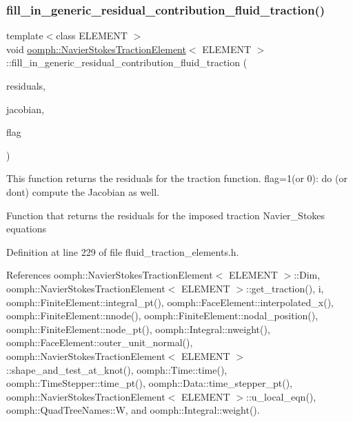 \subsubsection{\texorpdfstring{fill\+\_\+in\+\_\+generic\+\_\+residual\+\_\+contribution\+\_\+fluid\+\_\+traction()}{fill\_in\_generic\_residual\_contribution\_fluid\_traction()}}
{\footnotesize\ttfamily template$<$class E\+L\+E\+M\+E\+NT $>$ \\
void \hyperlink{classoomph_1_1NavierStokesTractionElement}{oomph\+::\+Navier\+Stokes\+Traction\+Element}$<$ E\+L\+E\+M\+E\+NT $>$\+::fill\+\_\+in\+\_\+generic\+\_\+residual\+\_\+contribution\+\_\+fluid\+\_\+traction (\begin{DoxyParamCaption}\item[{\hyperlink{classoomph_1_1Vector}{Vector}$<$ double $>$ \&}]{residuals,  }\item[{\hyperlink{classoomph_1_1DenseMatrix}{Dense\+Matrix}$<$ double $>$ \&}]{jacobian,  }\item[{unsigned}]{flag }\end{DoxyParamCaption})\hspace{0.3cm}{\ttfamily [protected]}}



This function returns the residuals for the traction function. flag=1(or 0)\+: do (or don\textquotesingle{}t) compute the Jacobian as well. 

Function that returns the residuals for the imposed traction Navier\+\_\+\+Stokes equations 

Definition at line 229 of file fluid\+\_\+traction\+\_\+elements.\+h.



References oomph\+::\+Navier\+Stokes\+Traction\+Element$<$ E\+L\+E\+M\+E\+N\+T $>$\+::\+Dim, oomph\+::\+Navier\+Stokes\+Traction\+Element$<$ E\+L\+E\+M\+E\+N\+T $>$\+::get\+\_\+traction(), i, oomph\+::\+Finite\+Element\+::integral\+\_\+pt(), oomph\+::\+Face\+Element\+::interpolated\+\_\+x(), oomph\+::\+Finite\+Element\+::nnode(), oomph\+::\+Finite\+Element\+::nodal\+\_\+position(), oomph\+::\+Finite\+Element\+::node\+\_\+pt(), oomph\+::\+Integral\+::nweight(), oomph\+::\+Face\+Element\+::outer\+\_\+unit\+\_\+normal(), oomph\+::\+Navier\+Stokes\+Traction\+Element$<$ E\+L\+E\+M\+E\+N\+T $>$\+::shape\+\_\+and\+\_\+test\+\_\+at\+\_\+knot(), oomph\+::\+Time\+::time(), oomph\+::\+Time\+Stepper\+::time\+\_\+pt(), oomph\+::\+Data\+::time\+\_\+stepper\+\_\+pt(), oomph\+::\+Navier\+Stokes\+Traction\+Element$<$ E\+L\+E\+M\+E\+N\+T $>$\+::u\+\_\+local\+\_\+eqn(), oomph\+::\+Quad\+Tree\+Names\+::W, and oomph\+::\+Integral\+::weight().



